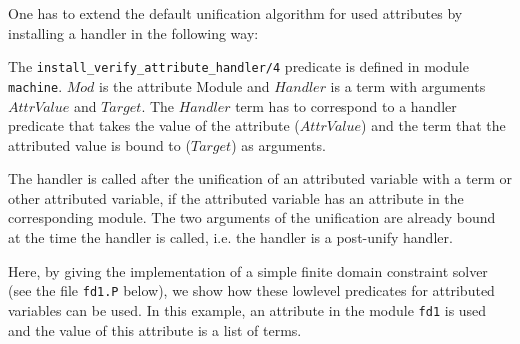 One has to extend the default unification algorithm for used attributes by installing
a handler in the following way:


\noindent The \texttt{install\_verify\_attribute\_handler/4} 
predicate is defined in module \texttt{machine}. $Mod$ is the attribute Module
and $Handler$ is a term with arguments $AttrValue$ and $Target$. The $Handler$
term has to correspond to a handler predicate that takes the value of the
attribute ($AttrValue$) and the term that the attributed value is bound to
($Target$) as arguments.

The handler is called after the unification of an attributed variable with a
term or other attributed variable, if the attributed variable has an attribute
in the corresponding module. The two arguments of the unification are already
bound at the time the handler is called, i.e. the handler is a post-unify handler.

Here, by giving the implementation of a simple finite domain constraint
solver (see the file \texttt{fd1.P} below), we show how these lowlevel predicates
for attributed variables can be used.  In this example, an attribute in the module
\texttt{fd1} is used and the value of this attribute is a list of terms.

